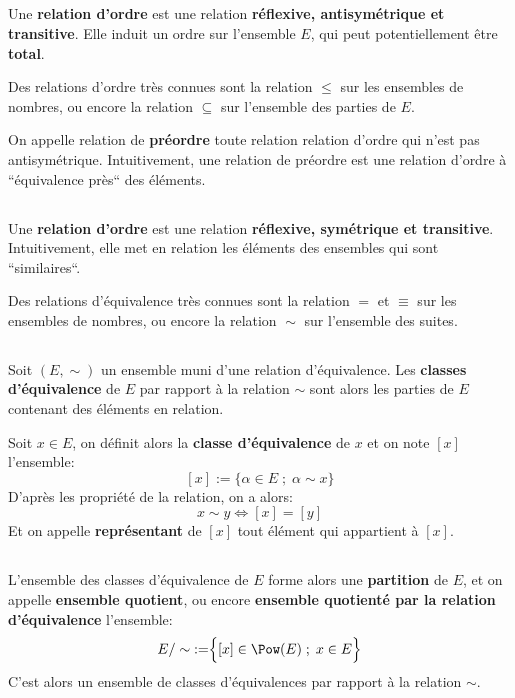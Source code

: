 \subsection*{}
Une \textbf{relation d'ordre} est une relation \textbf{réflexive, antisymétrique et transitive}. Elle induit un ordre sur l'ensemble \(E\), qui peut potentiellement être \textbf{total}.\<

Des relations d'ordre très connues sont la relation \(\boxed{\leq}\) sur les ensembles de nombres, ou encore la relation \(\boxed{\subseteq}\) sur l'ensemble des parties de \(E\).\<

On appelle relation de \textbf{préordre} toute relation relation d'ordre qui n'est pas antisymétrique. Intuitivement, une relation de préordre est une relation d'ordre à ``équivalence près`` des éléments.

\subsection*{}
Une \textbf{relation d'ordre} est une relation \textbf{réflexive, symétrique et transitive}. Intuitivement, elle met en relation les éléments des ensembles qui sont ``similaires``.\<

Des relations d'équivalence très connues sont la relation \(\boxed{=}\) et \(\boxed{\equiv}\) sur les ensembles de nombres, ou encore la relation \(\boxed{\sim}\) sur l'ensemble des suites.\<

\subsection*{}
Soit \((E, \sim)\) un ensemble muni d'une relation d'équivalence.\+
Les \textbf{classes d'équivalence} de \(E\) par rapport à la relation \(\sim\) sont alors les parties de \(E\) contenant des éléments en relation.\<

Soit \(x \in E\), on définit alors la \textbf{classe d'équivalence} de \(x\) et on note \([x]\) l'ensemble:
\[
    [x] := \Bigr\{ \alpha \in E \; ; \; \alpha \sim x \Bigr\}
\]
D'après les propriété de la relation, on a alors:
\[
    \boxed{
        x \sim y \Longleftrightarrow [x] = [y]
    }
\]
Et on appelle \textbf{représentant} de \([x]\) tout élément qui appartient à \([x]\).

\subsection*{}
L'ensemble des classes d'équivalence de \(E\) forme alors une \textbf{partition} de \(E\), et on appelle \textbf{ensemble quotient}, ou encore \textbf{ensemble quotienté par la relation d'équivalence} l'ensemble:
\[
    E / \sim \; := \Bigr\{ [x] \in \Pow(E) \; ; \; x \in E \Bigr\}
\]
C'est alors un ensemble de classes d'équivalences par rapport à la relation \(\sim\).\<

